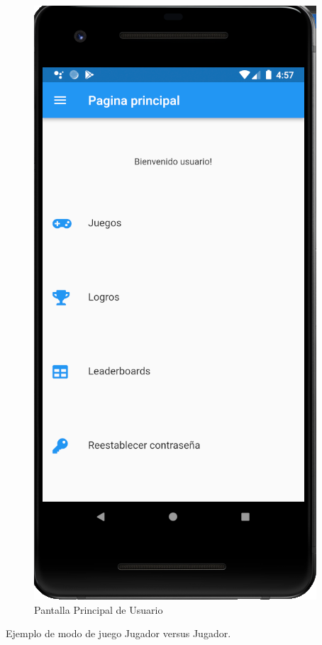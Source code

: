 \documentclass{article}
\begin{document}
\begin{figure}[H]
    \centering
    \includegraphics[scale=0.8]{imgs/Imp/MainUsuario}
    \caption{Pantalla Principal de Usuario}
\end{figure}
Ejemplo de modo de juego Jugador versus Jugador.
\end{document}
